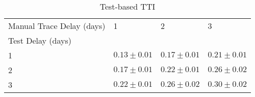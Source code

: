 \documentclass{article}
\begin{document}
    \begin{table}[H]
         \begin{tabular}{llll}
\toprule
Manual Trace Delay (days) &                1 &                2 &                3 \\
Test Delay (days) &                  &                  &                  \\
\midrule
1                 &  $0.13 \pm 0.01$ &  $0.17 \pm 0.01$ &  $0.21 \pm 0.01$ \\
2                 &  $0.17 \pm 0.01$ &  $0.22 \pm 0.01$ &  $0.26 \pm 0.02$ \\
3                 &  $0.22 \pm 0.01$ &  $0.26 \pm 0.02$ &  $0.30 \pm 0.02$ \\
\bottomrule
\end{tabular}

        \caption{Test-based TTI}
    \end{table}
    

\clearpage
\end{document}
